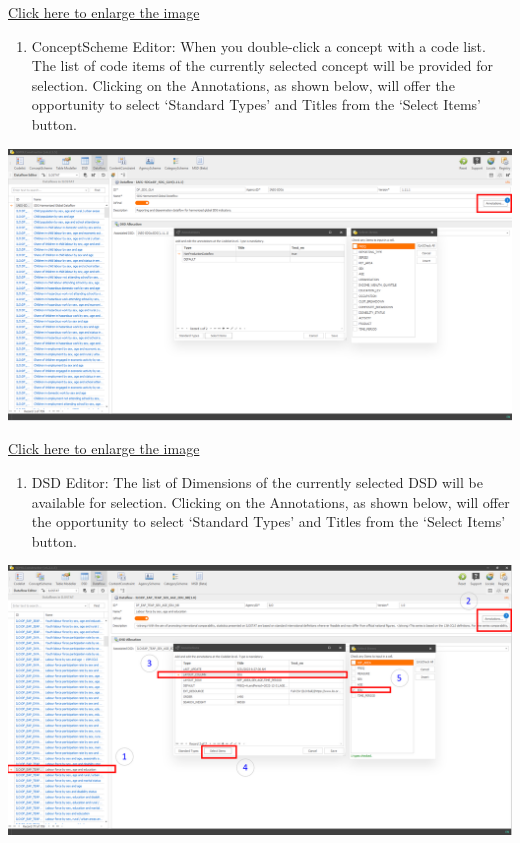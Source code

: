 \documentclass[
]{book}
\providecommand{\tightlist}{%
  \setlength{\itemsep}{0pt}\setlength{\parskip}{0pt}}
\begin{document}
\href{images/image8.png}{Click here to enlarge the image}

\begin{enumerate}
\def\labelenumi{\arabic{enumi}.}
\setcounter{enumi}{1}
\tightlist
\item
  ConceptScheme Editor: When you double-click a concept with a code list. The list of code items of the currently selected concept will be provided for selection. Clicking on the Annotations, as shown below, will offer the opportunity to select `Standard Types' and Titles from the `Select Items' button.
\end{enumerate}

\begin{center}\includegraphics[width=1\linewidth]{./images/image9} \end{center}

\href{images/image9.png}{Click here to enlarge the image}

\begin{enumerate}
\def\labelenumi{\arabic{enumi}.}
\setcounter{enumi}{2}
\tightlist
\item
  DSD Editor: The list of Dimensions of the currently selected DSD will be available for selection. Clicking on the Annotations, as shown below, will offer the opportunity to select `Standard Types' and Titles from the `Select Items' button.
\end{enumerate}

\begin{center}\includegraphics[width=1\linewidth]{./images/image10} \end{center}
\end{document}
